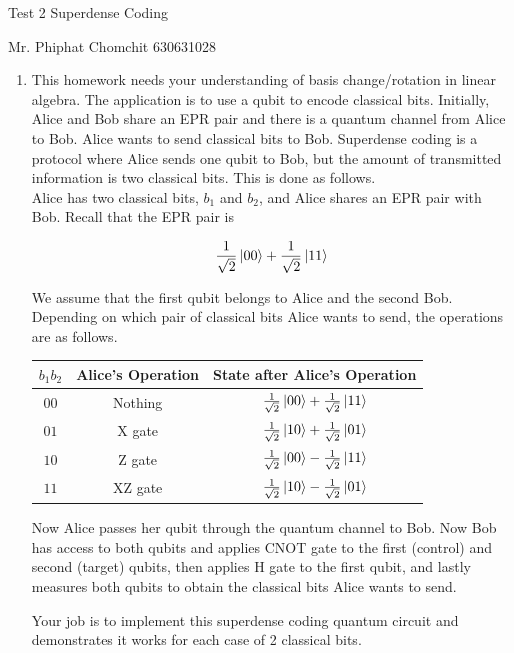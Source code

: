 \documentclass[12pt, a4paper]{article}
\begin{document}
	\begin{center}
		Test 2   Superdense Coding
	\end{center}
	
	Mr. Phiphat Chomchit 630631028
	\begin{enumerate}
	\item This homework needs your understanding of basis change/rotation in linear algebra. The application is to use a qubit to encode classical bits. Initially, Alice and Bob share an EPR pair and there is a quantum channel from Alice to Bob. Alice wants to send classical bits to Bob. Superdense coding is a protocol where Alice sends one qubit to Bob, but the amount of transmitted information is two classical bits. This is done as follows.\\
	
	Alice has two classical bits, $b_1$ and $b_2$, and Alice shares an EPR pair with Bob. Recall that the EPR pair is
	
	$$\frac{1}{\sqrt{2}}\ket{00} + \frac{1}{\sqrt{2}}\ket{11}$$
	
	
	We assume that the first qubit belongs to Alice and the second Bob. Depending on which pair of classical bits Alice wants to send, the operations are as follows.\\
	
		\begin{center}
			\begin{tabular}{ |c|c|c|}
				\hline
				$b_1b_2$ & Alice’s Operation & State after Alice’s Operation \\
				\hline
				$00$ & Nothing & $\frac{1}{\sqrt{2}}\ket{00} + \frac{1}{\sqrt{2}}\ket{11}$\\
				\hline
				$01$ & X gate & $\frac{1}{\sqrt{2}}\ket{10} + \frac{1}{\sqrt{2}}\ket{01}$\\
				\hline
				$10$ & Z gate & $\frac{1}{\sqrt{2}}\ket{00} - \frac{1}{\sqrt{2}}\ket{11}$\\
				\hline
				$11$ & XZ gate & $\frac{1}{\sqrt{2}}\ket{10} - \frac{1}{\sqrt{2}}\ket{01}$\\
				\hline

			\end{tabular}
		\end{center}
		

	Now Alice passes her qubit through the quantum channel to Bob. Now Bob has access to both qubits and 
	applies CNOT gate to the first (control) and second (target) qubits, then applies H gate to the first qubit, 
	and lastly measures both qubits to obtain the classical bits Alice wants to send.
	
	Your job is to implement this superdense coding quantum circuit and demonstrates it works for each case 
	of 2 classical bits.
	
	\end{enumerate}
\end{document}
